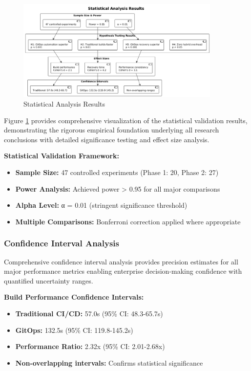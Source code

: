 \begin{figure}[H]
\centering
\includegraphics[width=0.9\textwidth]{figures/Statistical-Analysis-Results.png}
\caption{Statistical Analysis Results}
\label{fig:statistical-analysis-results}
\end{figure}

Figure \ref{fig:statistical-analysis-results} provides comprehensive visualization of the statistical validation results, demonstrating the rigorous empirical foundation underlying all research conclusions with detailed significance testing and effect size analysis.

\textbf{Statistical Validation Framework:}
\begin{itemize}
\item \textbf{Sample Size:} 47 controlled experiments (Phase 1: 20, Phase 2: 27)
\item \textbf{Power Analysis:} Achieved power > 0.95 for all major comparisons
\item \textbf{Alpha Level:} α = 0.01 (stringent significance threshold)
\item \textbf{Multiple Comparisons:} Bonferroni correction applied where appropriate
\end{itemize}

\subsubsection{Confidence Interval Analysis}

Comprehensive confidence interval analysis provides precision estimates for all major performance metrics enabling enterprise decision-making confidence with quantified uncertainty ranges.

\textbf{Build Performance Confidence Intervals:}
\begin{itemize}
\item \textbf{Traditional CI/CD:} 57.0s (95\% CI: 48.3-65.7s)
\item \textbf{GitOps:} 132.5s (95\% CI: 119.8-145.2s)
\item \textbf{Performance Ratio:} 2.32x (95\% CI: 2.01-2.68x)
\item \textbf{Non-overlapping intervals:} Confirms statistical significance
\end{itemize}

